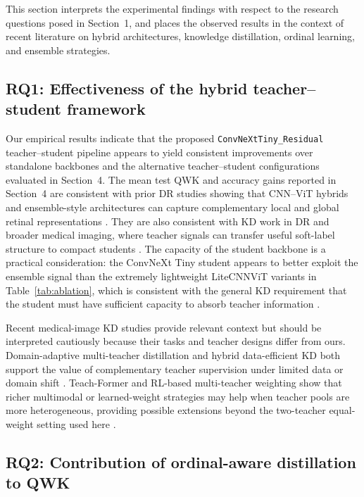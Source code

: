 \documentclass[a4paper,fleqn]{cas-dc}
\begin{document}
This section interprets the experimental findings with respect to the research questions posed in Section~1, and places the observed results in the context of recent literature on hybrid architectures, knowledge distillation, ordinal learning, and ensemble strategies.

\subsection{RQ1: Effectiveness of the hybrid teacher--student framework}

Our empirical results indicate that the proposed \texttt{ConvNeXtTiny\_Residual} teacher--student pipeline appears to yield consistent improvements over standalone backbones and the alternative teacher--student configurations evaluated in Section~4. The mean test QWK and accuracy gains reported in Section~4 are consistent with prior DR studies showing that CNN--ViT hybrids and ensemble-style architectures can capture complementary local and global retinal representations \cite{zhang2025,goh2024,macsik2023}. They are also consistent with KD work in DR and broader medical imaging, where teacher signals can transfer useful soft-label structure to compact students \cite{hinton2015,islam2023,gou2021,nabavi2024,elassiouti2024}. The capacity of the student backbone is a practical consideration: the ConvNeXt Tiny student appears to better exploit the ensemble signal than the extremely lightweight LiteCNNViT variants in Table~\ref{tab:ablation}, which is consistent with the general KD requirement that the student must have sufficient capacity to absorb teacher information \cite{hinton2015,gou2021,liu2022}.

Recent medical-image KD studies provide relevant context but should be interpreted cautiously because their tasks and teacher designs differ from ours. Domain-adaptive multi-teacher distillation and hybrid data-efficient KD both support the value of complementary teacher supervision under limited data or domain shift \cite{nabavi2024,elassiouti2024}. Teach-Former and RL-based multi-teacher weighting show that richer multimodal or learned-weight strategies may help when teacher pools are more heterogeneous, providing possible extensions beyond the two-teacher equal-weight setting used here \cite{hossain2025,yang2025}.

\subsection{RQ2: Contribution of ordinal-aware distillation to QWK}
\end{document}
